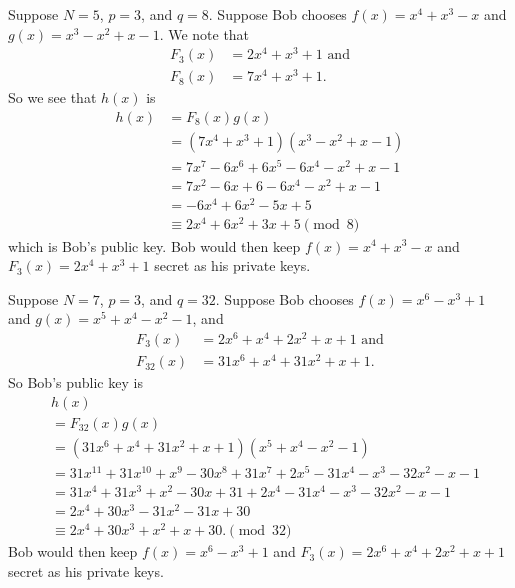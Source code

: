 \begin{example}
    Suppose $N = 5$, $p = 3$, and $q = 8$. Suppose Bob chooses $f(x) = x^4 + x^3 - x$ and $g(x) = x^3 - x^2 + x - 1$. We note that 
    \begin{align*}
        F_3(x) &= 2x^4 + x^3 + 1 \text{ and}\\
        F_8(x) &= 7x^4 + x^3 + 1.
    \end{align*}
    So we see that $h(x)$ is
    \begin{align*}
        h(x) &= F_8(x)g(x)\\
        &= (7x^4 + x^3 + 1)(x^3 - x^2 + x - 1)\\
        &= 7x^7 - 6x^6 + 6x^5 - 6x^4 - x^2 + x - 1\\
        &= 7x^2 - 6x + 6 - 6x^4 - x^2 + x - 1\\
        &= -6x^4 + 6x^2 - 5x + 5\\
        &\equiv 2x^4 + 6x^2 + 3x + 5 \pmod8
    \end{align*}
    which is Bob's public key. Bob would then keep $f(x) = x^4 + x^3 - x$ and $F_3(x) = 2x^4 + x^3 + 1$ secret as his private keys.
\end{example}
\begin{example}
    Suppose $N = 7$, $p = 3$, and $q = 32$. Suppose Bob chooses $f(x) = x^6 - x^3 + 1$ and $g(x) = x^5 + x^4 - x^2 - 1$, and
    \begin{align*}
        F_3(x) &= 2x^6 + x^4 + 2x^2 + x + 1 \text{ and}\\
        F_{32}(x) &= 31x^6 + x^4 + 31x^2 + x + 1.
    \end{align*}
    So Bob's public key is
    \begin{align*}
        &h(x)\\
        &= F_{32}(x)g(x)\\
        &= (31x^6 + x^4 + 31x^2 + x + 1)(x^5 + x^4 - x^2 - 1)\\
        &= 31x^{11} + 31x^{10} + x^9 - 30x^8 + 31x^7 + 2x^5 - 31x^4 - x^3 - 32x^2 - x - 1\\
        &= 31x^4 + 31x^3 + x^2 - 30x + 31 + 2x^4 - 31x^4 - x^3 - 32x^2 - x - 1\\
        &= 2x^4 + 30x^3 - 31x^2 - 31x + 30\\
        &\equiv 2x^4 + 30x^3 + x^2 + x + 30. \pmod{32}
    \end{align*}
    Bob would then keep $f(x) = x^6 - x^3 + 1$ and $F_3(x) = 2x^6 + x^4 + 2x^2 + x + 1$ secret as his private keys.
\end{example}


